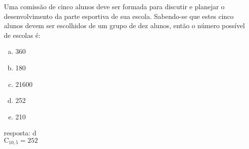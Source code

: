 \begin{ex}
 Uma comissão de cinco alunos deve ser formada para discutir e planejar o desenvolvimento da parte esportiva de sua escola.  Sabendo-se que estes cinco alunos devem ser escolhidos de um grupo de dez  alunos, então o número possível de escolas é:
    \begin{enumerate}[(a)]
    \item 360
    \item 180
    \item 21600
    \item 252
    \item 210
    \end{enumerate}
      \begin{sol}
       resposta: d \\
       $\mathrm{C}_{{10},5}=252$
      \end{sol}
\end{ex}